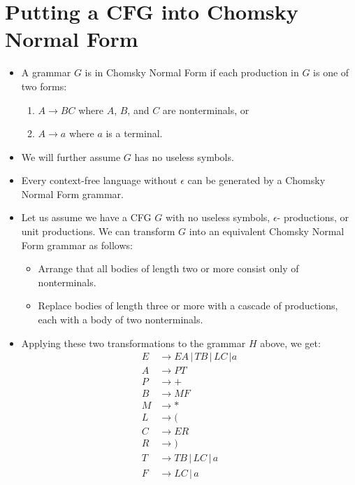 \documentclass[]{article}
\begin{document}
\section{Putting a CFG into Chomsky Normal Form}
  \begin{itemize}
    \item A grammar $G$ is in Chomsky Normal Form if each production in $G$ is 
    one of two forms:
      \begin{enumerate}
        \item $A \rightarrow BC$ where $A$, $B$, and $C$ are nonterminals, or
        \item $A \rightarrow a$ where $a$ is a terminal.
      \end{enumerate}
    \item We will further assume $G$ has no useless symbols.
    \item Every context-free language without $\epsilon$ can be generated by a 
    Chomsky Normal Form grammar.
    \item Let us assume we have a CFG $G$ with no useless symbols, $\epsilon$-
    productions, or unit productions. We can transform $G$ into an equivalent 
    Chomsky Normal Form grammar as follows:
      \begin{itemize}
        \item Arrange that all bodies of length two or more consist only of 
        nonterminals.
        \item Replace bodies of length three or more with a cascade of 
        productions, each with a body of two nonterminals.
      \end{itemize}
    \item Applying these two transformations to the grammar $H$ above, we get:
      \begin{align*}
        E &\rightarrow EA \, | \, TB \, | \, LC \, | a \\
        A &\rightarrow PT                              \\
        P &\rightarrow +                               \\
        B &\rightarrow MF                              \\
        M &\rightarrow *                               \\
        L &\rightarrow (                               \\
        C &\rightarrow ER                              \\
        R &\rightarrow )                               \\
        T &\rightarrow TB \, | \, LC \, | \, a         \\
        F &\rightarrow LC \, | \, a                    \\
      \end{align*}
  \end{itemize}
\end{document}
